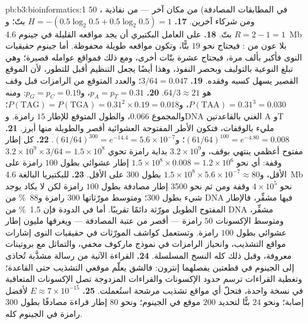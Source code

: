 \begin{solution}{pb:b3:bioinformatics:1}
$50$ في المطابقات المصادفة) من مكان آخر --- من نفاذية
، ومن شركاء آخرين.
\textbf{17.} $H = -(0.5\log_{2}0.5 + 0.5\log_{2}0.5) = 1$ بتّ؛ و$R = 2 -
1 = 1$ بتّ.
\textbf{18.} على العامل البكتيري أن يجد مواقعه القليلة في جينوم
\qty{4.6}{Mb} بلا عون من : فيحتاج نحو $19$
بتًّا، وتكون مواقعه طويلة محفوظة. أما جينوم حقيقيات النوى فأكبر
بألف مرة، فيحتاج عشرة بتّات أخرى، ومع ذلك فمواقع عوامله
قصيرة؛ وهي تبلغ النوعية بالتوليف وبحصر
 النفوذ، وهذا أيضًا يجعل التنظيم أقبل
للتطور، لأن الموقع القصير يسهل كسبه وفقده.
\textbf{19.} $3/64 = 0.047$؛ والعدد المتوقع من الرامزات قبل
وقف هو $64/3 \approx 21$.
\textbf{20.} $p_{A} = p_{T} = 0.31$، و$p_{G} = p_{C} = 0.19$: ومنه $P(\text{TAA})
= 0.31^{3} = 0.030$، و$P(\text{TAG}) = P(\text{TGA}) = 0.31^{2}\times 0.19
= 0.018$؛ والمجموع $0.066$، والطول المتوقع للإطار $15$ رامزة. وDNA الغني
بالقاعدتين A وT مليء بالوقفات، فتكون الأطر المفتوحة العشوائية أقصر والطويلة
منها أبرز.
\textbf{21.} $(61/64)^{100} = e^{-4.80} = 0.008$؛ و$(61/64)^{300} =
e^{-14.4} = 5.6\times 10^{-7}$.
\textbf{22.} كل إطار مفتوح أعظمي ينتهي بوقف، و$3.2\times
10^{9}$ بداية رامزة تحوي $3.2\times 10^{9}\times 3/64 = 1.5\times
10^{8}$ وقفة: أي نحو $1.5\times 10^{8}\times 0.008 = 1.2\times 10^{6}$
إطار عشوائي بطول $100$ رامزة على الأقل، و$1.5\times 10^{8}\times
5.6\times 10^{-7} \approx 80$ بطول $300$ على الأقل.
\textbf{23.} للبكتيريا البالغة \qty{4.6}{Mb} نحو $4\times 10^{5}$ وقفة
ومن ثم نحو \num{3500} إطار مصادفة بطول $100$ رامزة لكن لا يكاد يوجد
شيء بطول $300$؛ ومتوسط مورّثاتها $300$ رامزة و\qty{88}{\%} من DNA فيها
مشفِّر، فالإطار المفتوح الطويل مورّثة دائمًا تقريبًا. أما في الدودة فإن
\qty{1.5}{\%} من DNA مشفِّر، ومتوسط الإكسونات $50$ رامزة --- أقصر
من عتبة المصادفة --- ويغرقها مليون إطار عشوائي بطول $100$
رامزة. وتستعمل كواشف المورّثات في حقيقيات النوى إشارات مواقع التشذيب،
وانحياز الرامزات في نموذج ماركوف مخفي، والتماثل مع بروتينات معروفة، وقبل
ذلك كله النسخ المسلسلة.
\textbf{24.} القراءة الآتية من رسالة مشذَّبة تُحاذى إلى الجينوم في
قطعتين يفصلهما إنترون: فالشق يعلّم موقعي التشذيب
حتى القاعدة؛ وتغطية القراءات ترسم حدود الإكسونات والقراءات المزدوجة تصل
الإكسونات المتعاقبة في نسخة واحدة، فتحلّ أي مواقع تشذيب مرشحة
استُعملت.
\textbf{25.} $E \approx 7\times 10^{-15}$ لأفضل إصابة؛ ونحو $24$
بتًّا لتحديد $200$ موقع في الجينوم؛ ونحو $80$ إطار قراءة مصادفًا
بطول $300$ رامزة في الجينوم كله.
\end{solution}
